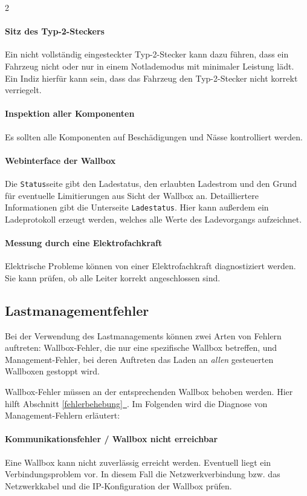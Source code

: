 \documentclass[a4paper,10pt]{article}
\newcommand*{\fullref}[1]{Abschnitt \hyperref[{#1}]{\ref*{#1}~\nameref*{#1}}}
\begin{document}
\begin{multicols*}{2}
    \paragraph*{Sitz des Typ-2-Steckers} Ein nicht vollständig eingesteckter Typ-2-Stecker kann dazu führen,
        dass ein Fahrzeug nicht oder nur in einem Notlademodus mit minimaler Leistung lädt. Ein Indiz hierfür kann sein, dass
        das Fahrzeug den Typ-2-Stecker nicht korrekt verriegelt.
    \paragraph*{Inspektion aller Komponenten} Es sollten alle Komponenten
        auf Beschädigungen und Nässe kontrolliert werden.
    \paragraph*{Webinterface der Wallbox} Die \texttt{Status}seite gibt den Ladestatus, den erlaubten Ladestrom und den Grund für eventuelle Limitierungen aus
        Sicht der Wallbox an. Detailliertere Informationen gibt die
        Unterseite \texttt{Ladestatus}. Hier kann außerdem ein Ladeprotokoll
        erzeugt werden, welches alle Werte des Ladevorgangs aufzeichnet.
    \paragraph*{Messung durch eine Elektrofachkraft} Elektrische Probleme können von
        einer Elektrofachkraft diagnostiziert werden. Sie kann prüfen, ob alle Leiter
        korrekt angeschlossen sind.

    \subsection{Lastmanagementfehler}
    Bei der Verwendung des Lastmanagements können zwei Arten von Fehlern auftreten: Wallbox-Fehler, die nur eine spezifische Wallbox betreffen, und Management-Fehler,
    bei deren Auftreten das Laden an \textit{allen} gesteuerten Wallboxen gestoppt wird.

    Wallbox-Fehler müssen an der entsprechenden Wallbox behoben werden. Hier
	hilft \fullref{fehlerbehebung}. Im Folgenden wird die Diagnose von Management-Fehlern erläutert:

    \paragraph*{Kommunikationsfehler / Wallbox nicht erreichbar}
    Eine Wallbox kann nicht zuverlässig erreicht werden. Eventuell liegt ein
	Verbindungsproblem vor. In diesem Fall die Netzwerkverbindung bzw. das
	Netzwerkkabel und die IP-Konfiguration der Wallbox prüfen.


\end{multicols*}
\end{document}

